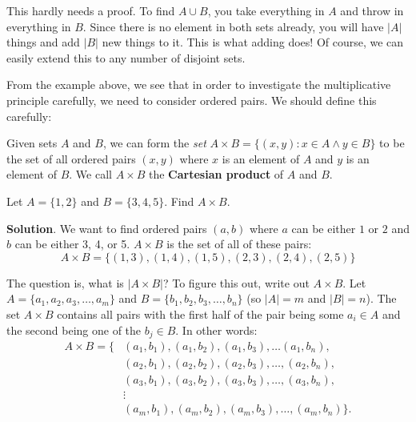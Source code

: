 \documentclass[11pt,]{book}
\newcommand{\terminology}[1]{\textbf{#1}}
\theoremstyle{ptxplainnotitle}
\theoremstyle{ptxplaintitle}
\theoremstyle{ptxdefinitionnotitle}
\theoremstyle{ptxdefinitiontitle}
\theoremstyle{ptxdefinitionnotitle}
\theoremstyle{ptxdefinitiontitle}
\theoremstyle{ptxdefinitionnotitle}
\theoremstyle{ptxdefinitiontitle}
\theoremstyle{ptxdefinitiontitlenonumber}
\theoremstyle{ptxdefinitiontitlenonumber}
\numberwithin{equation}{chapter}
\newcommand{\st}{:}
\newcommand{\card}[1]{\left| #1 \right|}
\newcommand{\amp}{&}
\begin{document}
\hypertarget{p-999}{}%
This hardly needs a proof. To find \(A \cup B\), you take everything in \(A\) and throw in everything in \(B\). Since there is no element in both sets already, you will have \(\card{A}\) things and add \(\card{B}\) new things to it. This is what adding does! Of course, we can easily extend this to any number of disjoint sets.%
\par
\hypertarget{p-1000}{}%
From the example above, we see that in order to investigate the multiplicative principle carefully, we need to consider ordered pairs. We should define this carefully:%
\begin{assemblage}\label{assemblage-14}
\hypertarget{p-1001}{}%
Given sets \(A\) and \(B\), we can form the \emph{set} \(A \times B = \{(x,y) \st x \in A \wedge y \in B\}\) to be the set of all ordered pairs \((x,y)\) where \(x\) is an element of \(A\) and \(y\) is an element of \(B\). We call \(A \times B\) the \terminology{Cartesian product} of \(A\) and \(B\).%
\end{assemblage}
\begin{example}\label{example-40}
\hypertarget{p-1002}{}%
Let \(A = \{1,2\}\) and \(B=\{3,4,5\}\). Find \(A \times B\).%
\par\smallskip%
\noindent\textbf{Solution}.\hypertarget{solution-130}{}\quad%
\hypertarget{p-1003}{}%
We want to find ordered pairs \((a,b)\) where \(a\) can be either \(1\) or \(2\) and \(b\) can be either 3, 4, or 5. \(A \times B\) is the set of all of these pairs:%
\begin{equation*}
A \times B = \{(1,3), (1,4), (1,5), (2,3), (2,4), (2,5)\}
\end{equation*}
%
\end{example}
\hypertarget{p-1004}{}%
The question is, what is \(\card{A \times B}\)? To figure this out, write out \(A \times B\). Let \(A = \{a_1,a_2, a_3, \ldots, a_m\}\) and \(B = \{b_1,b_2, b_3, \ldots, b_n\}\) (so \(\card{A} = m\) and \(\card{B} = n\)). The set \(A \times B\) contains all pairs with the first half of the pair being some \(a_i \in A\) and the second being one of the \(b_j \in B\). In other words:%
\begin{align*}
A \times B = \{ \amp (a_1, b_1), (a_1, b_2), (a_1, b_3), \ldots (a_1, b_n),\\
\amp (a_2, b_1), (a_2, b_2), (a_2, b_3), \ldots, (a_2, b_n),\\
\amp (a_3, b_1), (a_3, b_2), (a_3, b_3), \ldots, (a_3, b_n),\\
\amp \vdots\\
\amp (a_m, b_1), (a_m, b_2), (a_m, b_3), \ldots, (a_m, b_n)\}.
\end{align*}
\end{document}
